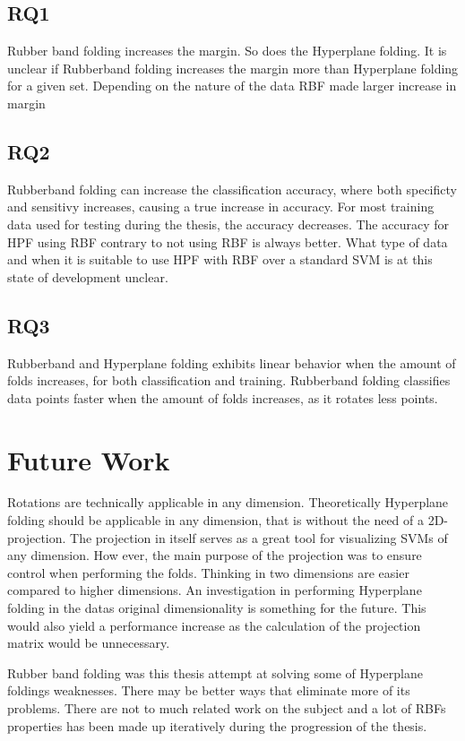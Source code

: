 \documentclass[a4paper,twoside]{bth}
\begin{document}
\section{RQ1}
Rubber band folding increases the margin. So does the Hyperplane folding. It is unclear if Rubberband folding increases the margin more than Hyperplane folding for a given set. Depending on the nature of the data RBF made larger increase in margin
\section{RQ2}
Rubberband folding can increase the classification accuracy, where both specificty and sensitivy increases, causing a true increase in accuracy. For most training data used for testing during the thesis, the accuracy decreases. The accuracy for HPF using RBF contrary to not using RBF is always better. What type of data and when it is suitable to use HPF with RBF over a standard SVM is at this state of development unclear. 

\section{RQ3}
Rubberband and Hyperplane folding exhibits linear behavior when the amount of folds increases, for both classification and training. Rubberband folding classifies data points faster when the amount of folds increases, as it rotates less points. 

\chapter{Future Work}
\par Rotations are technically applicable in any dimension. Theoretically Hyperplane folding should be applicable in any dimension, that is without the need of a 2D-projection. The projection in itself serves as a great tool for visualizing SVMs of any dimension. How ever, the main purpose of the projection was to ensure control when performing the folds. Thinking in two dimensions are easier compared to higher dimensions. An investigation in performing Hyperplane folding in the datas original dimensionality is something for the future. This would also yield a performance increase as the calculation of the projection matrix would be unnecessary.

\par Rubber band folding was this thesis attempt at solving some of Hyperplane foldings weaknesses. There may be better ways that eliminate more of its problems. There are not to much related work on the subject and a lot of RBFs properties has been made up iteratively during the progression of the thesis.
\end{document}
